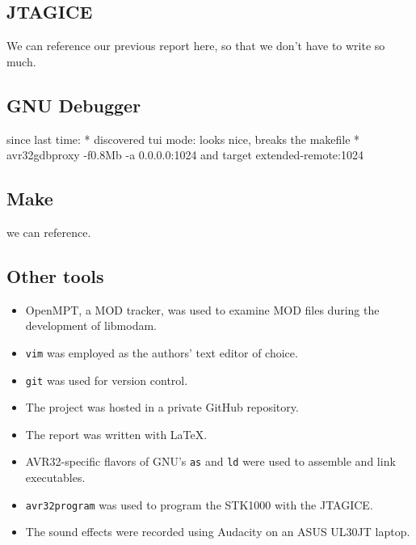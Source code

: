 
\subsection{JTAGICE}
We can reference our previous report here, so that we don't have to write so much.

\subsection{GNU Debugger}
since last time:
* discovered tui mode: looks nice, breaks the makefile
* avr32gdbproxy -f0.8Mb -a 0.0.0.0:1024 and target extended-remote:1024

\subsection{Make}
we can reference.

\subsection{Other tools}

\begin{itemize}
\item OpenMPT, a MOD tracker, was used to examine MOD files during the development of libmodam.
\item \texttt{vim} was employed as the authors' text editor of choice.
\item \texttt{git} was used for version control.
\item The project was hosted in a private GitHub repository.
\item The report was written with \LaTeX.
\item AVR32-specific flavors of GNU's \texttt{as} and \texttt{ld} were used to assemble and link executables.
\item \texttt{avr32program} was used to program the STK1000 with the JTAGICE.
\item The sound effects were recorded using Audacity on an ASUS UL30JT laptop.
\end{itemize}

